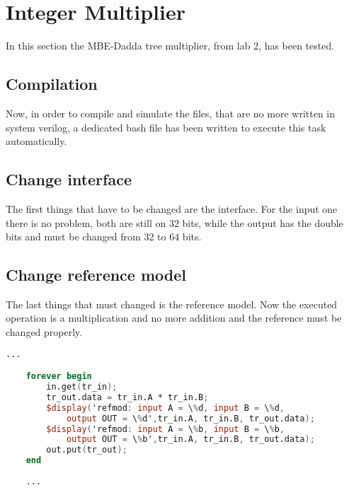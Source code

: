 %
\chapter{Integer Multiplier}
\label{cha3}

In this section the MBE-Dadda tree multiplier, from lab 2, has been tested.

\section{Compilation}
Now, in order to compile and simulate the files, that are no more written in system verilog, a dedicated 
bash file has been written to execute this task automatically.



\section{Change interface}

The first things that have to be changed are the interface. For the input one there is no problem,
both are still on 32 bits, while the output has the double bits and must be changed from 32 to 64 bits.



\section{Change reference model}

The last things that must changed is the reference model. Now the executed operation is a multiplication and 
no more addition and the reference must be changed properly.

\begin{lstlisting}[language=Verilog, caption=Inside refmode.sv]
    ... 

    forever begin
        in.get(tr_in);
        tr_out.data = tr_in.A * tr_in.B;
        $display('refmod: input A = \%d, input B = \%d, 
            output OUT = \%d',tr_in.A, tr_in.B, tr_out.data);
        $display('refmod: input A = \%b, input B = \%b, 
            output OUT = \%b',tr_in.A, tr_in.B, tr_out.data);
        out.put(tr_out);
    end
    
    ...
\end{lstlisting}

